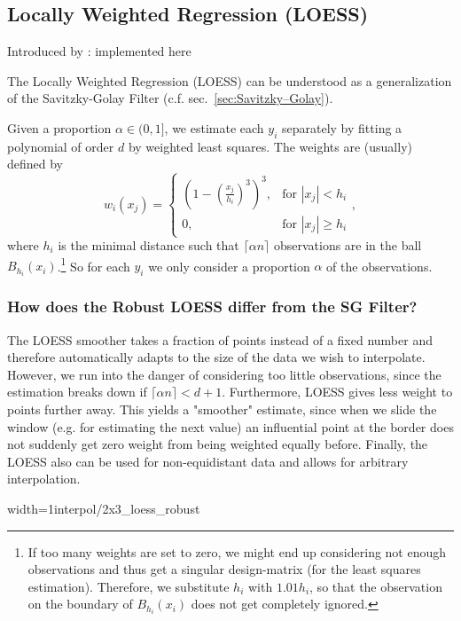 \subsection{Locally Weighted Regression (LOESS)}
\label{sec:loess}
Introduced by : \cite{clevelandRobustLocallyWeighted1979}
implemented here \cite{cappellariATLAS3DProjectXX2013}

The Locally Weighted Regression (LOESS) can be understood as a generalization of the Savitzky-Golay Filter (c.f. sec.~\ref{sec:Savitzky–Golay}).

Given a proportion $\alpha \in (0,1]$, we estimate each $y_i$ separately by fitting a polynomial of order $d$ by weighted least squares. The weights are (usually) defined by
$$w_i(x_j)=\begin{cases}
    \left(1-\left(\frac{x_j}{h_i}\right)^{3}\right)^{3}, & \text{for } |x_j|<h_i           \\
    0,                                                   & \text{for } |x_j| \geqslant h_i
  \end{cases} ,$$
where $h_i$ is the minimal distance such that $\lceil \alpha n\rceil$ observations are in the ball $B_{h_i}(x_i)$.\footnote{If too many weights are set to zero, we might end up considering not enough observations and thus get a singular design-matrix (for the least squares estimation). Therefore, we substitute $h_i$ with $1.01 h_i$, so that the observation on the boundary of $B_{h_i}(x_i)$ does not get completely ignored.} So for each $y_i$ we only consider a proportion $\alpha$ of the observations.

\subsubsection{How does the Robust LOESS differ from the SG Filter?}
The LOESS smoother takes a fraction of points instead of a fixed number and therefore automatically adapts to the size of the data we wish to interpolate. However, we run into the danger of considering too little observations, since the estimation breaks down if $\lceil \alpha n\rceil < d+1$.
Furthermore, LOESS gives less weight to points further away. This yields a "smoother" estimate, since when we slide the window (e.g. for estimating the next value) an influential point at the border does not suddenly get zero weight from being weighted equally before.
Finally, the LOESS also can be used for non-equidistant data and allows for arbitrary interpolation.

\begin{my_figure}[h]{width=1\textwidth}{interpol/2x3_loess_robust}
  \caption{The LOESS smoother \RobItPlot}
  \label{fig:interpol/2x3_loess_robust}
\end{my_figure}

